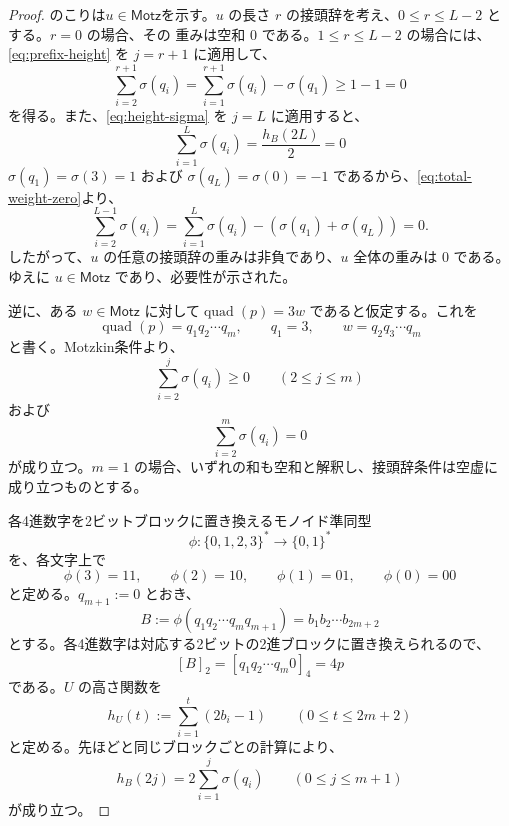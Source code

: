 \documentclass[12pt]{ltjsarticle}
\theoremstyle{plain}
\theoremstyle{definition}
\theoremstyle{plain}
\begin{document}
\begin{proof}
のこりは$u\in\mathsf{Motz}$を示す。$u$ の長さ $r$ の接頭辞を考え、$0\leq r\leq L-2$ とする。$r=0$ の場合、その
重みは空和 $0$ である。$1\leq r\leq L-2$ の場合には、
\eqref{eq:prefix-height} を $j=r+1$ に適用して、
\begin{equation}\label{eq:motzkin-prefix-nonnegative}
 \sum_{i=2}^{r+1}\sigma(q_i)
 =\sum_{i=1}^{r+1}\sigma(q_i)-\sigma(q_1)
 \geq1-1=0
\end{equation}
を得る。また、\eqref{eq:height-sigma} を $j=L$ に適用すると、
\begin{equation}\label{eq:total-weight-zero}
 \sum_{i=1}^{L}\sigma(q_i)
 =\frac{h_B(2L)}{2}
 =0
\end{equation}
$\sigma(q_1)=\sigma(3)=1$ および $\sigma(q_L)=\sigma(0)=-1$ であるから、\eqref{eq:total-weight-zero}より、
\[
 \sum_{i=2}^{L-1}\sigma(q_i)= \sum_{i=1}^{L}\sigma(q_i)-(\sigma(q_1)+\sigma(q_L))=0.
\]
したがって、$u$ の任意の接頭辞の重みは非負であり、$u$ 全体の重みは $0$ である。
ゆえに $u\in\mathsf{Motz}$ であり、必要性が示された。

逆に、ある $w\in\mathsf{Motz}$ に対して$ \operatorname{quad}(p)=3w$
であると仮定する。これを
\[
 \operatorname{quad}(p)=q_1q_2\cdots q_m,
 \qquad
 q_1=3,
 \qquad
 w=q_2q_3\cdots q_m
\]
と書く。Motzkin条件より、
\begin{equation}\label{eq:reverse-motzkin-prefix}
 \sum_{i=2}^{j}\sigma(q_i)\geq0
 \qquad(2\leq j\leq m)
\end{equation}
および
\begin{equation}\label{eq:reverse-motzkin-total}
 \sum_{i=2}^{m}\sigma(q_i)=0
\end{equation}
が成り立つ。$m=1$ の場合、いずれの和も空和と解釈し、接頭辞条件は空虚に
成り立つものとする。

各4進数字を2ビットブロックに置き換えるモノイド準同型
\[
 \phi:\{0,1,2,3\}^*\longrightarrow\{0,1\}^*
\]
を、各文字上で
\[
 \phi(3)=11,\qquad
 \phi(2)=10,\qquad
 \phi(1)=01,\qquad
 \phi(0)=00
\]
と定める。$q_{m+1}:=0$ とおき、
\[
 B:=\phi(q_1q_2\cdots q_mq_{m+1})
   =b_1b_2\cdots b_{2m+2}
\]
とする。各4進数字は対応する2ビットの2進ブロックに置き換えられるので、
\begin{equation}\label{eq:block-value}
 [B]_2=[q_1q_2\cdots q_m0]_4=4p
\end{equation}
である。$U$ の高さ関数を
\[
 h_U(t):=\sum_{i=1}^{t}(2b_i-1)
 \qquad(0\leq t\leq2m+2)
\]
と定める。先ほどと同じブロックごとの計算により、
\begin{equation}\label{eq:reverse-height-sigma}
 h_B(2j)=2\sum_{i=1}^{j}\sigma(q_i)
 \qquad(0\leq j\leq m+1)
\end{equation}
が成り立つ。


\end{proof}
\end{document}
